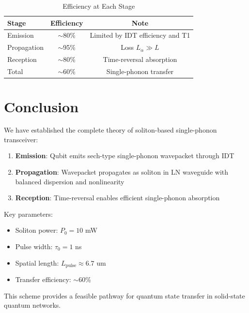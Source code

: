 \documentclass[12pt,a4paper]{article}
\theoremstyle{definition}
\begin{document}
\begin{table}[h]
\centering
\caption{Efficiency at Each Stage}
\begin{tabular}{lcc}
\toprule
Stage & Efficiency & Note \\
\midrule
Emission & $\sim$80\% & Limited by IDT efficiency and T1 \\
Propagation & $\sim$95\% & Loss $L_{\alpha} \gg L$ \\
Reception & $\sim$80\% & Time-reversal absorption \\
\midrule
Total & $\sim$60\% & Single-phonon transfer \\
\bottomrule
\end{tabular}
\end{table}

\section{Conclusion}

We have established the complete theory of soliton-based single-phonon transceiver:

\begin{enumerate}
\item \textbf{Emission}: Qubit emits sech-type single-phonon wavepacket through IDT
\item \textbf{Propagation}: Wavepacket propagates as soliton in LN waveguide with balanced dispersion and nonlinearity
\item \textbf{Reception}: Time-reversal enables efficient single-phonon absorption
\end{enumerate}

Key parameters:
\begin{itemize}
\item Soliton power: $P_0 = 10$ mW
\item Pulse width: $\tau_0 = 1$ ns
\item Spatial length: $L_{\text{pulse}} \approx 6.7$ um
\item Transfer efficiency: $\sim$60\%
\end{itemize}

This scheme provides a feasible pathway for quantum state transfer in solid-state quantum networks.
\end{document}
